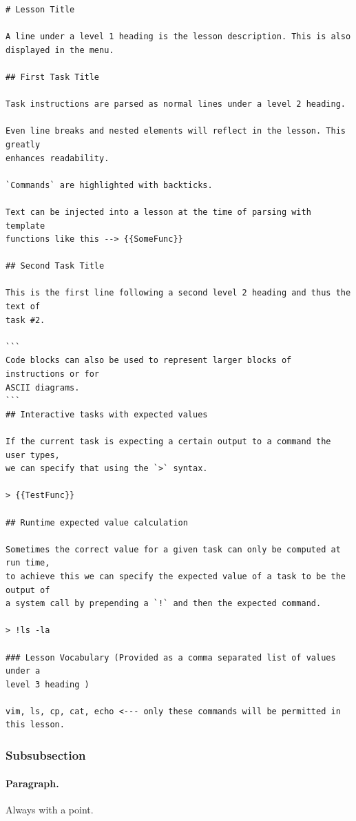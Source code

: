 \begin{lstlisting}[float=htbp, frame=single, language={}, label=lst:markdown, caption=Specification for Markdown lesson files.]
# Lesson Title

A line under a level 1 heading is the lesson description. This is also
displayed in the menu.

## First Task Title

Task instructions are parsed as normal lines under a level 2 heading.

Even line breaks and nested elements will reflect in the lesson. This greatly
enhances readability.

`Commands` are highlighted with backticks.

Text can be injected into a lesson at the time of parsing with template
functions like this --> {{SomeFunc}}

## Second Task Title

This is the first line following a second level 2 heading and thus the text of
task #2.

```
Code blocks can also be used to represent larger blocks of instructions or for
ASCII diagrams.
```
## Interactive tasks with expected values

If the current task is expecting a certain output to a command the user types,
we can specify that using the `>` syntax.

> {{TestFunc}}

## Runtime expected value calculation

Sometimes the correct value for a given task can only be computed at run time,
to achieve this we can specify the expected value of a task to be the output of
a system call by prepending a `!` and then the expected command.

> !ls -la

### Lesson Vocabulary (Provided as a comma separated list of values under a
level 3 heading )

vim, ls, cp, cat, echo <--- only these commands will be permitted in this lesson.

\end{lstlisting}

\subsubsection{Subsubsection}

\paragraph{Paragraph.} Always with a point.


